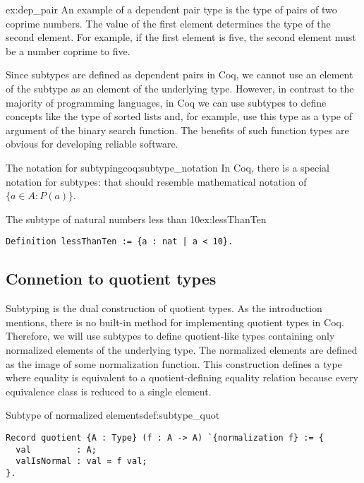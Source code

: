 \begin{example}{}{ex:dep_pair}
An example of a dependent pair type is the type of pairs of two coprime numbers. The value of the first element determines the type of the second element. For example, if the first element is five, the second element must be a number coprime to five.
\end{example}
Since subtypes are defined as dependent pairs in Coq, we cannot use an element of the subtype as an element of the underlying type. However, in contrast to the majority of programming languages, in Coq we can use subtypes to define concepts like the type of sorted lists and, for example, use this type as a type of argument of the binary search function. The benefits of such function types are obvious for developing reliable software.
\begin{coq}{The notation for subtyping}{coq:subtype_notation}
In Coq, there is a special notation for subtypes:  that should resemble mathematical notation of $\{a \in A: P(a)\}$.
\end{coq}
\begin{example}{The subtype of natural numbers less than 10}{ex:lessThanTen}
\begin{verbatim}
Definition lessThanTen := {a : nat | a < 10}.
\end{verbatim}
\end{example}
\subsection{Connetion to quotient types}
Subtyping is the dual construction of quotient types. As the introduction mentions, there is no built-in method for implementing quotient types in Coq. Therefore, we will use subtypes to define quotient-like types containing only normalized elements of the underlying type. The normalized elements are defined as the image of some normalization function. This construction defines a type where equality is equivalent to a quotient-defining equality relation because every equivalence class is reduced to a single element.
\begin{defi}{Subtype of normalized elements}{def:subtype_quot}
\begin{verbatim}
Record quotient {A : Type} (f : A -> A) `{normalization f} := {
  val         : A;
  valIsNormal : val = f val;
}.
\end{verbatim}
\end{defi}
